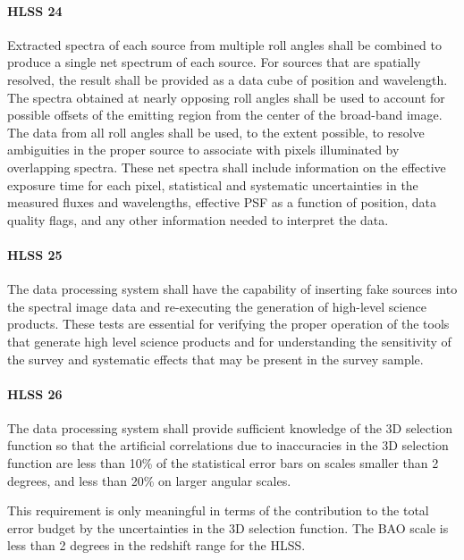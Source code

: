 \paragraph{HLSS 24} Extracted spectra of each source from multiple roll angles shall be
 combined to produce a single net spectrum of each source. For sources that are
 spatially resolved, the result shall be provided as a data cube of position and
 wavelength. The spectra obtained at nearly opposing roll angles shall be used to
 account for possible offsets of the emitting region from the center of the
 broad-band image. The data from all roll angles shall be used, to the extent
 possible, to resolve ambiguities in the proper source to associate with pixels
 illuminated by overlapping spectra. These net spectra shall include information
 on the effective exposure time for each pixel, statistical and systematic
 uncertainties in the measured fluxes and wavelengths, effective PSF as a
 function of position, data quality flags, and any other information needed to
 interpret the data.

\paragraph{HLSS 25} The data processing system shall have the capability of inserting fake sources into the spectral image data and re-executing the generation of
 high-level science products. These tests are essential for verifying the proper
 operation of the tools that generate high level science products and for
 understanding the sensitivity of the survey and systematic effects that may be
 present in the survey sample.

\paragraph{HLSS 26} The data processing system shall provide sufficient knowledge of the 3D selection function so that the artificial correlations due to inaccuracies in the 3D selection function are less than 10\% of the statistical error bars on
 scales smaller than 2 degrees, and less than 20\% on larger angular scales.

 This requirement is only meaningful in terms of the contribution to the total
 error budget by the uncertainties in the 3D selection function. The BAO scale is
 less than 2 degrees in the redshift range for the HLSS.

